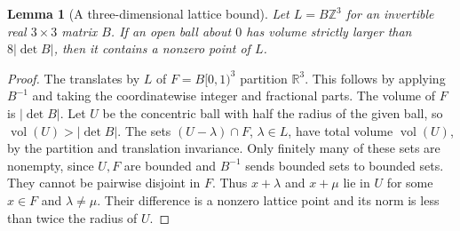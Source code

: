 \documentclass[11pt,oneside,openany]{book}
\theoremstyle{plain}
\newtheorem{lemma}[theorem]{Lemma}
\theoremstyle{definition}
\theoremstyle{remark}
\begin{document}
\begin{lemma}[A three-dimensional lattice bound]\label{lem:nt-minkowski}
Let \(L=B\mathbb Z^3\) for an invertible real \(3\times3\) matrix \(B\).
If an open ball about \(0\) has volume strictly larger than
\(8|\det B|\), then it contains a nonzero point of \(L\).
\end{lemma}
\begin{proof}
The translates by \(L\) of \(F=B[0,1)^3\) partition \(\mathbb R^3\).
This follows by applying \(B^{-1}\) and taking the coordinatewise
integer and fractional parts. The volume of \(F\) is \(|\det B|\).
Let \(U\) be the concentric ball with half the radius of the given
ball, so \(\operatorname{vol}(U)>|\det B|\). The sets
\((U-\lambda)\cap F\), \(\lambda\in L\), have total volume
\(\operatorname{vol}(U)\), by the partition and translation invariance.
Only finitely many of these sets are nonempty, since \(U,F\) are
bounded and \(B^{-1}\) sends bounded sets to bounded sets. They cannot
be pairwise disjoint in \(F\). Thus \(x+\lambda\) and \(x+\mu\) lie
in \(U\) for some \(x\in F\) and \(\lambda\ne\mu\). Their difference
is a nonzero lattice point and its norm is less than twice the radius
of \(U\).
\end{proof}
\end{document}
